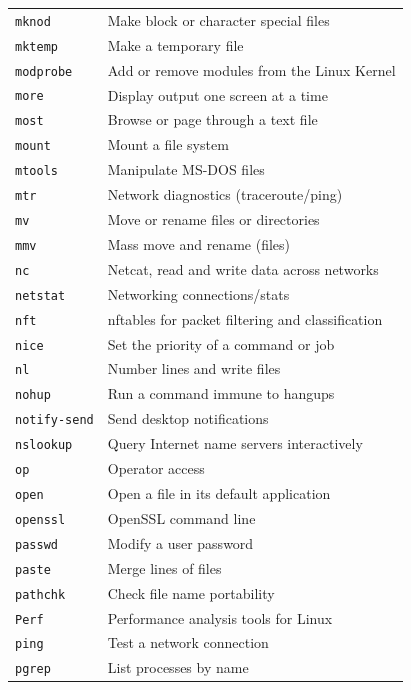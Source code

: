 \begin{longtable}{ll}
\texttt{mknod}       & Make block or character special files \\
\texttt{mktemp}      & Make a temporary file \\
\texttt{modprobe}    & Add or remove modules from the Linux Kernel \\
\texttt{more}        & Display output one screen at a time \\
\texttt{most}        & Browse or page through a text file \\
\texttt{mount}       & Mount a file system \\
\texttt{mtools}      & Manipulate MS-DOS files \\
\texttt{mtr}         & Network diagnostics (traceroute/ping) \\
\texttt{mv}          & Move or rename files or directories \\
\texttt{mmv}         & Mass move and rename (files) \\
\hline
\texttt{nc}          & Netcat, read and write data across networks \\
\texttt{netstat}     & Networking connections/stats \\
\texttt{nft}         & nftables for packet filtering and classification \\
\texttt{nice}        & Set the priority of a command or job \\
\texttt{nl}          & Number lines and write files \\
\texttt{nohup}       & Run a command immune to hangups \\
\texttt{notify-send} & Send desktop notifications \\
\texttt{nslookup}    & Query Internet name servers interactively \\
\hline
\texttt{op}          & Operator access \\
\texttt{open}        & Open a file in its default application \\
\texttt{openssl}     & OpenSSL command line \\
\hline
\texttt{passwd}      & Modify a user password \\
\texttt{paste}       & Merge lines of files \\
\texttt{pathchk}     & Check file name portability \\
\texttt{Perf}        & Performance analysis tools for Linux \\
\texttt{ping}        & Test a network connection \\
\texttt{pgrep}       & List processes by name \\

\end{longtable}
